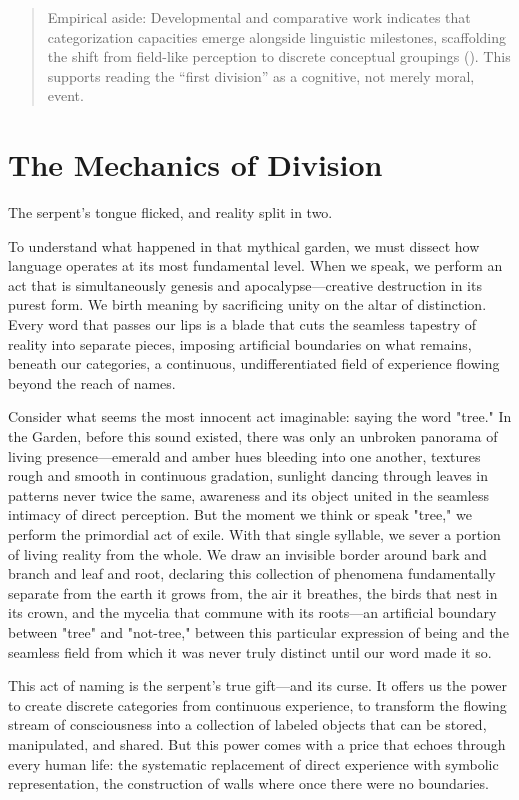 \begin{quote}\small
Empirical aside: Developmental and comparative work indicates that categorization capacities emerge alongside linguistic milestones, scaffolding the shift from field-like perception to discrete conceptual groupings (\parencite{tomasello2008origins,deacon1997symbolic}). This supports reading the “first division” as a cognitive, not merely moral, event.
\end{quote}

\section{The Mechanics of Division}

The serpent's tongue flicked, and reality split in two.

To understand what happened in that mythical garden, we must dissect how language operates at its most fundamental level. When we speak, we perform an act that is simultaneously genesis and apocalypse—creative destruction in its purest form. We birth meaning by sacrificing unity on the altar of distinction. Every word that passes our lips is a blade that cuts the seamless tapestry of reality into separate pieces, imposing artificial boundaries on what remains, beneath our categories, a continuous, undifferentiated field of experience flowing beyond the reach of names.

Consider what seems the most innocent act imaginable: saying the word "tree." In the Garden, before this sound existed, there was only an unbroken panorama of living presence—emerald and amber hues bleeding into one another, textures rough and smooth in continuous gradation, sunlight dancing through leaves in patterns never twice the same, awareness and its object united in the seamless intimacy of direct perception. But the moment we think or speak "tree," we perform the primordial act of exile. With that single syllable, we sever a portion of living reality from the whole. We draw an invisible border around bark and branch and leaf and root, declaring this collection of phenomena fundamentally separate from the earth it grows from, the air it breathes, the birds that nest in its crown, and the mycelia that commune with its roots—an artificial boundary between "tree" and "not-tree," between this particular expression of being and the seamless field from which it was never truly distinct until our word made it so.

This act of naming is the serpent's true gift—and its curse. It offers us the power to create discrete categories from continuous experience, to transform the flowing stream of consciousness into a collection of labeled objects that can be stored, manipulated, and shared. But this power comes with a price that echoes through every human life: the systematic replacement of direct experience with symbolic representation, the construction of walls where once there were no boundaries.

